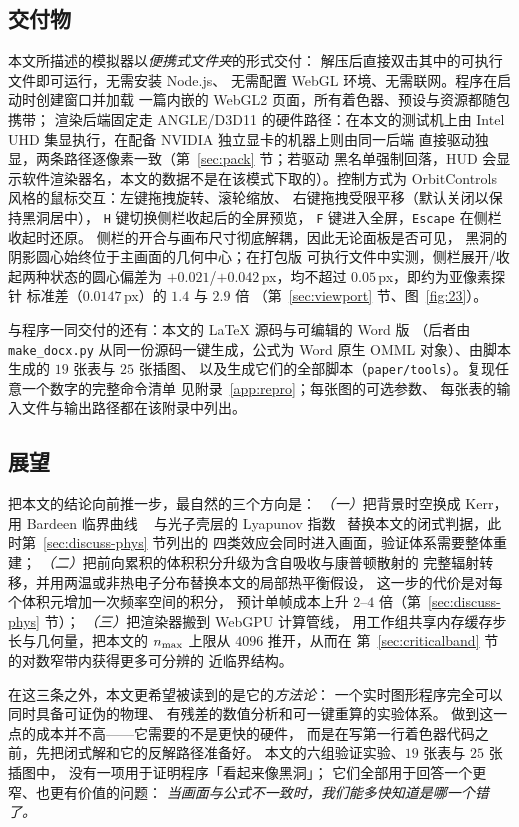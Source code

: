 \subsection{交付物}

本文所描述的模拟器以\emph{便携式文件夹}的形式交付：
解压后直接双击其中的可执行文件即可运行，无需安装 Node.js、
无需配置 WebGL 环境、无需联网。程序在启动时创建窗口并加载
一篇内嵌的 WebGL2 页面，所有着色器、预设与资源都随包携带；
渲染后端固定走 ANGLE/D3D11 的硬件路径：在本文的测试机上由
Intel UHD 集显执行，在配备 NVIDIA 独立显卡的机器上则由同一后端
直接驱动独显，两条路径逐像素一致（第~\ref{sec:pack} 节；若驱动
黑名单强制回落，HUD 会显示软件渲染器名，本文的数据不是在该模式下取的）。控制方式为
OrbitControls 风格的鼠标交互：左键拖拽旋转、滚轮缩放、
右键拖拽受限平移（默认关闭以保持黑洞居中），
\texttt{H} 键切换侧栏收起后的全屏预览，
\texttt{F} 键进入全屏，\texttt{Escape} 在侧栏收起时还原。
侧栏的开合与画布尺寸彻底解耦，因此无论面板是否可见，
黑洞的阴影圆心始终位于主画面的几何中心；在打包版
可执行文件中实测，侧栏展开/收起两种状态的圆心偏差为
$+0.021$/$+0.042$\,px，均不超过 $0.05$\,px，即约为亚像素探针
标准差（$0.0147$\,px）的 $1.4$ 与 $2.9$ 倍
（第~\ref{sec:viewport} 节、图~\ref{fig:23}）。

与程序一同交付的还有：本文的 \LaTeX{} 源码与可编辑的 Word 版
（后者由 \texttt{make\_docx.py} 从同一份源码一键生成，公式为 Word 原生
OMML 对象）、由脚本生成的 $19$ 张表与 $25$ 张插图、
以及生成它们的全部脚本（\texttt{paper/tools}）。复现任意一个数字的完整命令清单
见附录~\ref{app:repro}；每张图的可选参数、
每张表的输入文件与输出路径都在该附录中列出。

\subsection{展望}

把本文的结论向前推一步，最自然的三个方向是：
\emph{（一）}把背景时空换成 Kerr，用 Bardeen 临界曲线
~\cite{bardeen1973} 与光子壳层的 Lyapunov 指数~\cite{johnson2020,gralla2020}
替换本文的闭式判据，此时第~\ref{sec:discuss-phys} 节列出的
四类效应会同时进入画面，验证体系需要整体重建；
\emph{（二）}把前向累积的体积积分升级为含自吸收与康普顿散射的
完整辐射转移，并用两温或非热电子分布替换本文的局部热平衡假设，
这一步的代价是对每个体积元增加一次频率空间的积分，
预计单帧成本上升 $2$--$4$ 倍（第~\ref{sec:discuss-phys} 节）；
\emph{（三）}把渲染器搬到 WebGPU 计算管线，
用工作组共享内存缓存步长与几何量，把本文的
$n_{\rm max}$ 上限从 $4096$ 推开，从而在
第~\ref{sec:criticalband} 节的对数窄带内获得更多可分辨的
近临界结构。

在这三条之外，本文更希望被读到的是它的\emph{方法论}：
一个实时图形程序完全可以同时具备可证伪的物理、
有残差的数值分析和可一键重算的实验体系。
做到这一点的成本并不高——它需要的不是更快的硬件，
而是在写第一行着色器代码之前，先把闭式解和它的反解路径准备好。
本文的六组验证实验、$19$ 张表与 $25$ 张插图中，
没有一项用于证明程序「看起来像黑洞」；
它们全部用于回答一个更窄、也更有价值的问题：
\emph{当画面与公式不一致时，我们能多快知道是哪一个错了。}
